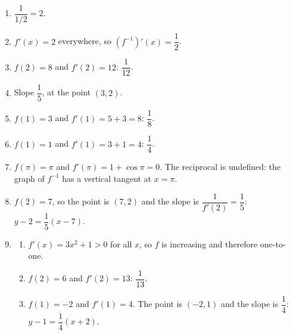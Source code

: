\documentclass[11pt]{article}
\begin{document}
\newpage
\begin{solbox}
\begin{enumerate}[leftmargin=*,itemsep=4pt]
  \item $\dfrac{1}{1/2}=2$.
  \item $f'(x)=2$ everywhere, so $\left(f^{-1}\right)'(x)=\dfrac12$.
  \item $f(2)=8$ and $f'(2)=12$: $\dfrac{1}{12}$.
  \item Slope $\dfrac15$, at the point $(3,2)$.
  \item $f(1)=3$ and $f'(1)=5+3=8$: $\dfrac18$.
  \item $f(1)=1$ and $f'(1)=3+1=4$: $\dfrac14$.
  \item $f(\pi)=\pi$ and $f'(\pi)=1+\cos\pi=0$. The reciprocal is undefined: the graph of $f^{-1}$ has a vertical tangent at $x=\pi$.
  \item $f(2)=7$, so the point is $(7,2)$ and the slope is $\dfrac{1}{f'(2)}=\dfrac15$: $y-2=\dfrac15(x-7)$.
  \item \begin{enumerate}[label=(\alph*),leftmargin=*,itemsep=3pt]
    \item $f'(x)=3x^2+1>0$ for all $x$, so $f$ is increasing and therefore one-to-one.
    \item $f(2)=6$ and $f'(2)=13$: $\dfrac{1}{13}$.
    \item $f(1)=-2$ and $f'(1)=4$. The point is $(-2,1)$ and the slope is $\dfrac14$: $y-1=\dfrac14(x+2)$.
  \end{enumerate}
\end{enumerate}
\end{solbox}
\end{document}
